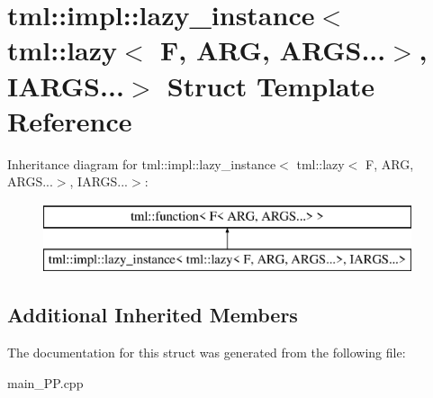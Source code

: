\hypertarget{structtml_1_1impl_1_1lazy__instance_3_01tml_1_1lazy_3_01F_00_01ARG_00_01ARGS_8_8_8_4_00_01IARGS_8_8_8_4}{\section{tml\+:\+:impl\+:\+:lazy\+\_\+instance$<$ tml\+:\+:lazy$<$ F, A\+R\+G, A\+R\+G\+S...$>$, I\+A\+R\+G\+S...$>$ Struct Template Reference}
\label{structtml_1_1impl_1_1lazy__instance_3_01tml_1_1lazy_3_01F_00_01ARG_00_01ARGS_8_8_8_4_00_01IARGS_8_8_8_4}
}
Inheritance diagram for tml\+:\+:impl\+:\+:lazy\+\_\+instance$<$ tml\+:\+:lazy$<$ F, A\+R\+G, A\+R\+G\+S...$>$, I\+A\+R\+G\+S...$>$\+:\begin{figure}[H]
\begin{center}
\leavevmode
\includegraphics[height=2.000000cm]{structtml_1_1impl_1_1lazy__instance_3_01tml_1_1lazy_3_01F_00_01ARG_00_01ARGS_8_8_8_4_00_01IARGS_8_8_8_4}
\end{center}
\end{figure}
\subsection*{Additional Inherited Members}


The documentation for this struct was generated from the following file\+:\begin{DoxyCompactItemize}
\item 
main\+\_\+\+P\+P.\+cpp\end{DoxyCompactItemize}
